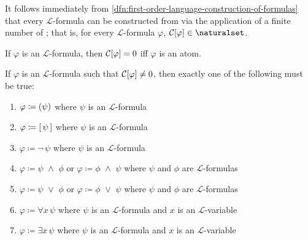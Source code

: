 \begin{cor}
     \label{cor:first-order-language-every-formula-has-finite-complexity}
    It follows immediately from \cref{dfn:first-order-language-construction-of-formulas} that every \( \mathcal{L} \)-formula can be constructed
    from  via the application of a finite number of
    ; that is, for every \( \mathcal{L} \)-formula \( \varphi \),
    \( \folcomplexityofformula{\varphi} \in \naturalset \).
\end{cor}

\begin{cor}
     \label{cor:first-order-language-only-atoms-can-have-zero-complexity}
    If \( \varphi \) is an \( \mathcal{L} \)-formula, then \( \folcomplexityofformula{\varphi} = 0 \) iff \( \varphi \) is an atom.
\end{cor}

\begin{cor}
     \label{cor:first-order-language-every-formula-with-non-zero-complexity-can-be-decomposed}
    If \( \varphi \) is an \( \mathcal{L} \)-formula such that \( \folcomplexityofformula{\varphi} \neq 0 \), then exactly one of the following must be true:
    \begin{enumerate}[topsep=2pt,label=\textup{\texttt{(\alph*)}}]
        \item \( \varphi \coloneq \mleft( \psi \mright) \) where \( \psi \) is an \( \mathcal{L} \)-formula
        \item \( \varphi \coloneq \mleft[ \, \psi \, \mright] \) where \( \psi \) is an \( \mathcal{L} \)-formula
        \item \( \varphi \coloneq \lnot \, \psi \) where \( \psi \) is an \( \mathcal{L} \)-formula
        \item \( \varphi \coloneq \psi \,\,{\land}\,\, \phi \) or \( \varphi \coloneq \phi \,\,{\land}\,\, \psi \)
            where \( \psi \) and \( \phi \) are \( \mathcal{L} \)-formulas
        \item \( \varphi \coloneq \psi \,\,{\lor}\,\, \phi \) or \( \varphi \coloneq \phi \,\,{\lor}\,\, \psi \) where \( \psi \) and \( \phi \)
            are \( \mathcal{L} \)-formulas
        \item \( \varphi \coloneq \forall x \, \psi \) where \( \psi \) is an \( \mathcal{L} \)-formula and \( x \) is an \( \mathcal{L} \)-variable
        \item \( \varphi \coloneq \exists x \, \psi \) where \( \psi \) is an \( \mathcal{L} \)-formula and \( x \) is an \( \mathcal{L} \)-variable
    \end{enumerate}
\end{cor}

